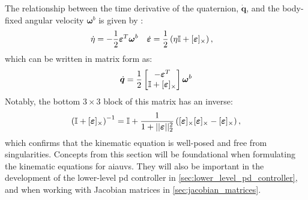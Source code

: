 The relationship between the time derivative of the quaternion, \(\dot{\bm{q
}}\), and the body-fixed angular velocity \(\bm{\omega}^b\) is given by
\cite{modsim}:
\begin{align}
    \dot{\eta} &= -\frac{1}{2} \bm{\varepsilon}^T \bm{\omega}^b &
    \dot{\bm{\varepsilon}} &= \frac{1}{2} \left(\eta \mathbb{I} + [\bm{\varepsilon}]_{\times}\right),
\end{align}
which can be written in matrix form as:
\begin{align}
    \dot{\bm{q}} = \frac{1}{2} \begin{bmatrix}
        -\bm{\varepsilon}^T \\
        \mathbb{I} + [\bm{\varepsilon}]_{\times}
    \end{bmatrix}
    \bm{\omega}^b
\end{align}
Notably, the bottom \(3 \times 3\) block of this matrix has an inverse:
\begin{align}
    \left(
        \mathbb{I} + [\bm{\varepsilon}]_{\times}
    \right)^{-1}
    = 
    \mathbb{I} + \frac{1}{1+||\bm{\varepsilon}||_2^2}\left([\bm{\varepsilon}]_{\times}[\bm{\varepsilon}]_{\times}
    - [\bm{\varepsilon}]_{\times}\right),
\end{align}
which confirms that the kinematic equation is well-posed and free from 
singularities. Concepts from this section will be foundational when 
formulating the kinematic equations for \gls{aiauv}s. They will also be 
important in the development of the lower-level \gls{pd} controller in
\autoref{sec:lower_level_pd_controller}, and when working with Jacobian 
matrices in \autoref{sec:jacobian_matrices}.


